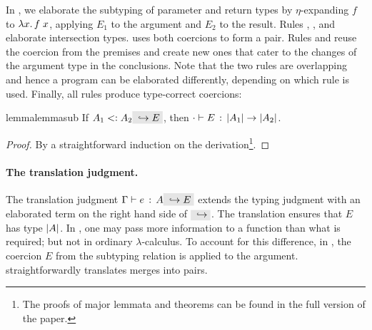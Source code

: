 In , we elaborate the subtyping of
parameter and return types by $\eta$-expanding $f$ to $\lamty x {\im {A_3}}
{\app f x}$, applying $E_1$ to the argument and $E_2$ to the result. Rules
, , and
 elaborate intersection types.
 uses both coercions to form a pair. Rules
 and  reuse the coercion
from the premises and create new ones that cater to the changes of the argument
type in the conclusions. Note that the two rules are overlapping and
hence a program can be elaborated differently, depending on which rule
is used. Finally, all rules produce type-correct coercions:



\begin{restatable}{lemma}{lemmasub}
  \label{lemma:sub}
  If $ A_1 \subtype A_2 \yields E $, then $ \jtype \cdot E {\im {A_1} \to \im {A_2}} $.
\end{restatable}

\begin{proof}
  By a straightforward induction on the derivation\footnote{The proofs of major lemmata and theorems can be found in the full version of the paper.}.
\end{proof}

\paragraph{The translation judgment.} The translation judgment $\jtype \Gamma e
A \yields E$ extends the typing judgment with an elaborated term on the right
hand side of $\yields {}$. The translation ensures that $E$ has type $\im A$. In
\name, one may pass more information to a function than what is required; but
not in ordinary $\lambda$-calculus. To account for this difference, in , the
coercion $E$ from the subtyping relation is applied to the argument.
 straightforwardly translates merges into pairs.


